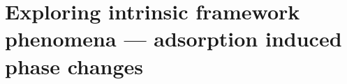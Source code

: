 
\graphicspath{ {\thisch/figures/} }

\chapter{Exploring intrinsic framework phenomena %
--- adsorption induced phase changes}%
\label{dut}





\pagebreak



